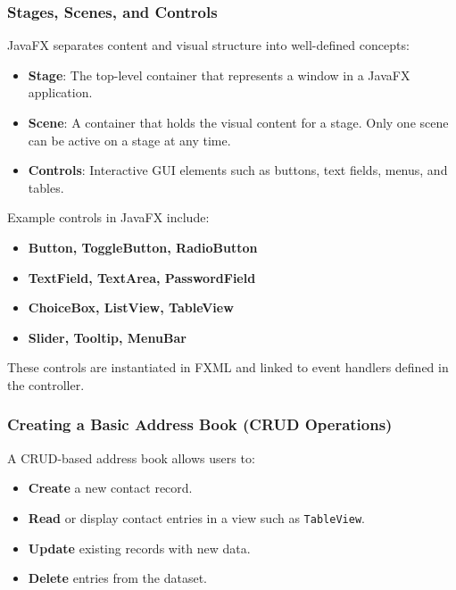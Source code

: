 \documentclass{article}
\newcommand{\codecmd}[1]{\textcolor[rgb]{0,0.5,0}{\texttt{#1}}}
\begin{document}
\subsubsection{Stages, Scenes, and Controls}

JavaFX separates content and visual structure into well-defined concepts:

\begin{itemize}
    \item \textbf{Stage}: The top-level container that represents a window in a JavaFX application.
    \item \textbf{Scene}: A container that holds the visual content for a stage. Only one scene can be active on a stage at any time.
    \item \textbf{Controls}: Interactive GUI elements such as buttons, text fields, menus, and tables.
\end{itemize}

Example controls in JavaFX include:

\begin{itemize}
    \item \textbf{Button, ToggleButton, RadioButton}
    \item \textbf{TextField, TextArea, PasswordField}
    \item \textbf{ChoiceBox, ListView, TableView}
    \item \textbf{Slider, Tooltip, MenuBar}
\end{itemize}

These controls are instantiated in FXML and linked to event handlers defined in the controller.

\subsubsection{Creating a Basic Address Book (CRUD Operations)}

A CRUD-based address book allows users to:

\begin{itemize}
    \item \textbf{Create} a new contact record.
    \item \textbf{Read} or display contact entries in a view such as \codecmd{TableView}.
    \item \textbf{Update} existing records with new data.
    \item \textbf{Delete} entries from the dataset.
\end{itemize}
\end{document}
